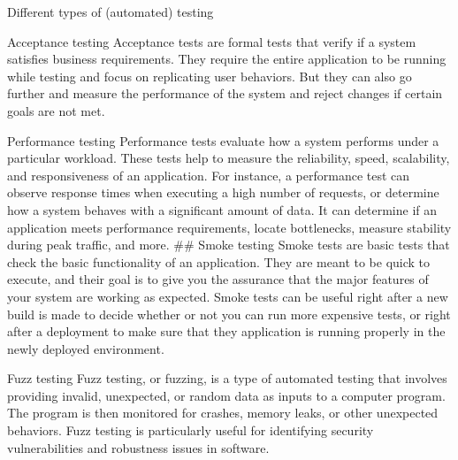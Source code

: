 \begin{frame}{Different types of (automated) testing}
\begin{block}{Acceptance testing}
\protect{}\label{acceptance-testing}
Acceptance tests are formal tests that verify if a system satisfies
business requirements. They require the entire application to be running
while testing and focus on replicating user behaviors. But they can also
go further and measure the performance of the system and reject changes
if certain goals are not met.
\end{block}

\begin{block}{Performance testing}
\protect{}\label{performance-testing}
Performance tests evaluate how a system performs under a particular
workload. These tests help to measure the reliability, speed,
scalability, and responsiveness of an application. For instance, a
performance test can observe response times when executing a high number
of requests, or determine how a system behaves with a significant amount
of data. It can determine if an application meets performance
requirements, locate bottlenecks, measure stability during peak traffic,
and more. \#\# Smoke testing Smoke tests are basic tests that check the
basic functionality of an application. They are meant to be quick to
execute, and their goal is to give you the assurance that the major
features of your system are working as expected. Smoke tests can be
useful right after a new build is made to decide whether or not you can
run more expensive tests, or right after a deployment to make sure that
they application is running properly in the newly deployed environment.
\end{block}

\begin{block}{Fuzz testing}
\protect{}\label{fuzz-testing}
Fuzz testing, or fuzzing, is a type of automated testing that involves
providing invalid, unexpected, or random data as inputs to a computer
program. The program is then monitored for crashes, memory leaks, or
other unexpected behaviors. Fuzz testing is particularly useful for
identifying security vulnerabilities and robustness issues in software.
\end{block}
\end{frame}
